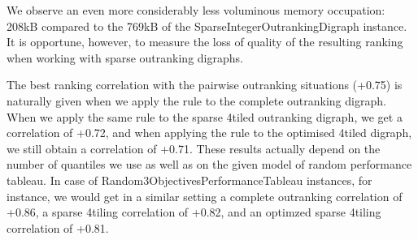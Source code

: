 \documentclass[a4paper,12pt,english]{sphinxhowto}
\begin{document}
We observe an even more considerably less voluminous memory occupation: 208kB compared to the 769kB of the SparseIntegerOutrankingDigraph instance. It is opportune, however, to measure the loss of quality of the resulting  ranking when working with sparse outranking digraphs.

\begin{sphinxVerbatim}[commandchars=\\\{\},numbers=left,firstnumber=1,stepnumber=1]
   
  
\PYGZbs{}
\PYGZbs{}
\PYGZbs{}
\end{sphinxVerbatim}

The best ranking correlation with the pairwise outranking situations (+0.75) is naturally given when we apply the  rule to the complete outranking digraph. When we apply the same rule to the sparse 4\sphinxhyphen{}tiled outranking digraph, we get a correlation of +0.72, and when applying the  rule to the optimised 4\sphinxhyphen{}tiled digraph, we still obtain a correlation of +0.71. These results actually depend on the number of quantiles we use as well as on the given model of random performance tableau. In case of Random3ObjectivesPerformanceTableau instances, for instance, we would get in a similar setting a complete outranking correlation of +0.86, a sparse 4\sphinxhyphen{}tiling correlation of +0.82, and an optimzed sparse 4\sphinxhyphen{}tiling correlation of +0.81.
\end{document}
